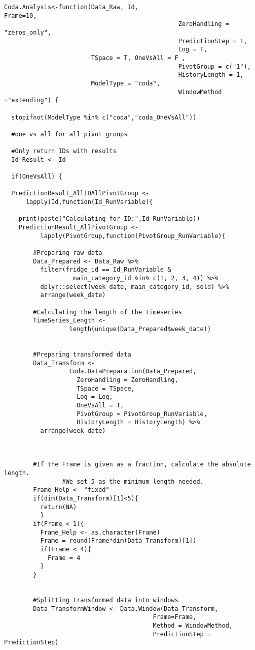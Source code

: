 \begin{verbatim}
Coda.Analysis<-function(Data_Raw, Id, 
Frame=10, 
												ZeroHandling = "zeros_only", 
												PredictionStep = 1, 
												Log = T,
                        TSpace = T, OneVsAll = F , 
												PivotGroup = c("1"), 
												HistoryLength = 1,
                        ModelType = "coda", 
												WindowMethod ="extending") {
  
  stopifnot(ModelType %in% c("coda","coda_OneVsAll"))
  
  #one vs all for all pivot groups
  
  #Only return IDs with results
  Id_Result <- Id
  
  if(OneVsAll) {
  
  PredictionResult_AllIDAllPivotGroup <- 
	  lapply(Id,function(Id_RunVariable){
		
    print(paste("Calculating for ID:",Id_RunVariable))
    PredictionResult_AllPivotGroup <- 
		  lapply(PivotGroup,function(PivotGroup_RunVariable){
      
        #Preparing raw data
        Data_Prepared <- Data_Raw %>%
          filter(fridge_id == Id_RunVariable &
                   main_category_id %in% c(1, 2, 3, 4)) %>%
          dplyr::select(week_date, main_category_id, sold) %>%
          arrange(week_date)
        
        #Calculating the length of the timeseries
        TimeSeries_Length <- 
				  length(unique(Data_Prepared$week_date))
        
        
        #Preparing transformed data
        Data_Transform <- 
				  Coda.DataPreparation(Data_Prepared,
					ZeroHandling = ZeroHandling,
					TSpace = TSpace, 
					Log = Log,
					OneVsAll = T,
					PivotGroup = PivotGroup_RunVariable,
					HistoryLength = HistoryLength) %>%
          arrange(week_date)
        

        
        #If the Frame is given as a fraction, calculate the absolute length.
				#We set 5 as the minimum length needed. 
        Frame_Help <- "fixed"
        if(dim(Data_Transform)[1]<5){
          return(NA)
          }
        if(Frame < 1){
          Frame_Help <- as.character(Frame)
          Frame = round(Frame*dim(Data_Transform)[1])
          if(Frame < 4){
            Frame = 4
          }
        }
        
        
        #Splitting transformed data into windows
        Data_TransformWindow <- Data.Window(Data_Transform,
                                         Frame=Frame,
                                         Method = WindowMethod,
                                         PredictionStep = PredictionStep)
        

\end{verbatim}
